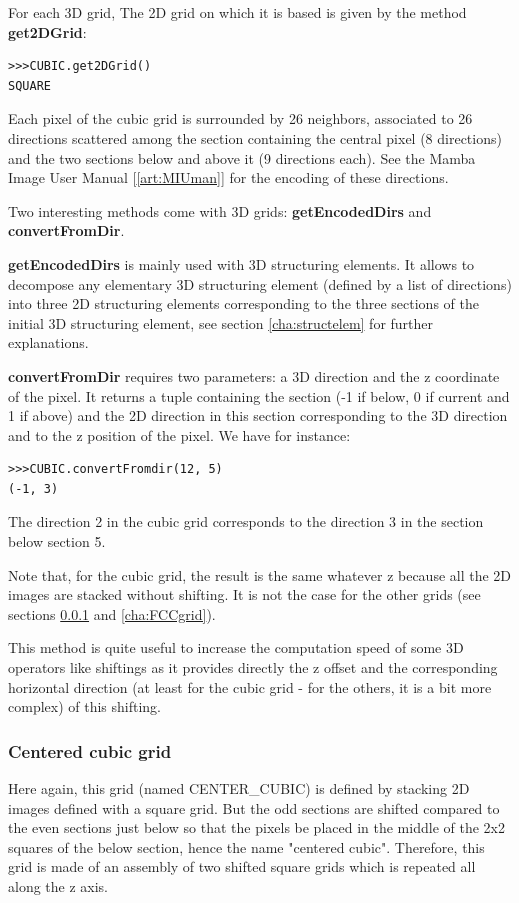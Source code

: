 \documentclass[a4paper,10pt,oneside]{article}
\begin{document}
For each 3D grid, The 2D grid on which it is based is given by the method \textbf{get2DGrid}:

\lstset{language=Python}
\begin{lstlisting}
>>>CUBIC.get2DGrid()
SQUARE
\end{lstlisting}

Each pixel of the cubic grid is surrounded by 26 neighbors, associated to 26 directions scattered among the section containing the
central pixel (8 directions) and the two sections below and above it (9 directions each). See the Mamba Image User Manual [\ref{art:MIUman}]
for the encoding of these directions.

Two interesting methods come with 3D grids: \textbf{getEncodedDirs} and \textbf{convertFromDir}.

\textbf{getEncodedDirs} is mainly used with 3D structuring elements. It allows to decompose any elementary 3D structuring element (defined
by a list of directions) into three 2D structuring elements corresponding to the three sections of the initial 3D structuring
element, see section \ref{cha:structelem} for further explanations.

\textbf{convertFromDir} requires two parameters: a 3D direction and the z coordinate of the pixel. It returns a tuple containing the section
(-1 if below, 0 if current and 1 if above) and the 2D direction in this section corresponding to the 3D direction and to the z position of the
pixel. We have for instance:

\lstset{language=Python}
\begin{lstlisting}
>>>CUBIC.convertFromdir(12, 5)
(-1, 3)
\end{lstlisting}

The direction 2 in the cubic grid corresponds to the direction 3 in the section below section 5.

Note that, for the cubic grid, the result is the same whatever z because all the 2D images are stacked without shifting. It is
not the case for the other grids (see sections \ref{cha:CCgrid} and \ref{cha:FCCgrid}).

This method is quite useful to increase the computation speed of some 3D operators like shiftings as it provides directly
the z offset and the corresponding horizontal direction (at least for the cubic grid - for the others, it is a bit more complex)
of this shifting.

\subsubsection{Centered cubic grid}
\label{cha:CCgrid}
Here again, this grid (named CENTER\_CUBIC) is defined by stacking 2D images defined with a square grid. But the odd sections
are shifted compared to the even sections just below so that the pixels be placed in the middle of the 2x2 squares of the below
section, hence the name "centered cubic". Therefore, this grid is made of an assembly of two shifted square grids which is
repeated all along the z axis.
\end{document}
